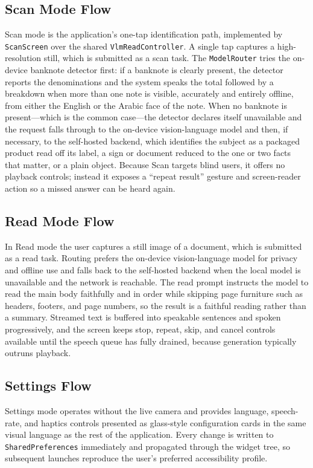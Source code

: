 \documentclass[12pt,a4paper]{report}
\begin{document}
\subsection{Scan Mode Flow}
Scan mode is the application's one-tap identification path, implemented by \texttt{ScanScreen} over the shared \texttt{VlmReadController}. A single tap captures a high-resolution still, which is submitted as a scan task. The \texttt{ModelRouter} tries the on-device banknote detector first: if a banknote is clearly present, the detector reports the denominations and the system speaks the total followed by a breakdown when more than one note is visible, accurately and entirely offline, from either the English or the Arabic face of the note. When no banknote is present---which is the common case---the detector declares itself unavailable and the request falls through to the on-device vision-language model and then, if necessary, to the self-hosted backend, which identifies the subject as a packaged product read off its label, a sign or document reduced to the one or two facts that matter, or a plain object. Because Scan targets blind users, it offers no playback controls; instead it exposes a ``repeat result'' gesture and screen-reader action so a missed answer can be heard again.

\subsection{Read Mode Flow}
In Read mode the user captures a still image of a document, which is submitted as a read task. Routing prefers the on-device vision-language model for privacy and offline use and falls back to the self-hosted backend when the local model is unavailable and the network is reachable. The read prompt instructs the model to read the main body faithfully and in order while skipping page furniture such as headers, footers, and page numbers, so the result is a faithful reading rather than a summary. Streamed text is buffered into speakable sentences and spoken progressively, and the screen keeps stop, repeat, skip, and cancel controls available until the speech queue has fully drained, because generation typically outruns playback.

\subsection{Settings Flow}
Settings mode operates without the live camera and provides language, speech-rate, and haptics controls presented as glass-style configuration cards in the same visual language as the rest of the application. Every change is written to \texttt{SharedPreferences} immediately and propagated through the widget tree, so subsequent launches reproduce the user's preferred accessibility profile.
\end{document}

